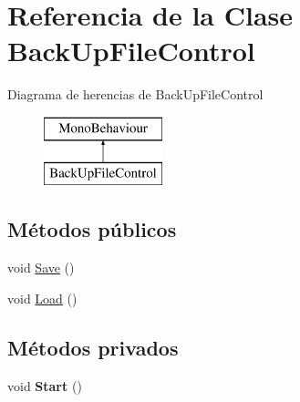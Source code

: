 \hypertarget{class_back_up_file_control}{}\section{Referencia de la Clase Back\+Up\+File\+Control}
\label{class_back_up_file_control}
Diagrama de herencias de Back\+Up\+File\+Control\begin{figure}[H]
\begin{center}
\leavevmode
\includegraphics[height=2.000000cm]{class_back_up_file_control}
\end{center}
\end{figure}
\subsection*{Métodos públicos}
\begin{DoxyCompactItemize}
\item 
void \mbox{\hyperlink{class_back_up_file_control_ac716204289bfc6374ac1f0f042497db0}{Save}} ()
\item 
void \mbox{\hyperlink{class_back_up_file_control_a112a5fe6a9344e96275115cdc17b008c}{Load}} ()
\end{DoxyCompactItemize}
\subsection*{Métodos privados}
\begin{DoxyCompactItemize}
\item 
\mbox{\label{class_back_up_file_control_a6c730f44ee25befbf01c75b8e8e737ed}} 
void {\bfseries Start} ()
\end{DoxyCompactItemize}
